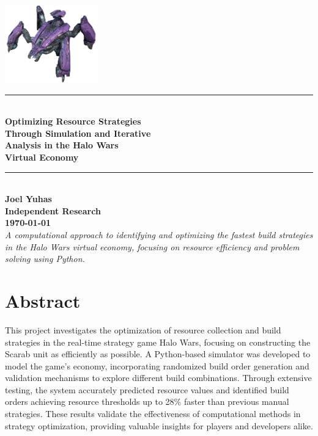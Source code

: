 \documentclass[a4paper, 12pt, english]{article}
\begin{document}
\begin{titlepage}
\begin{center}
\vspace*{2cm} %
\includegraphics[width=0.3\textwidth]{scarab.png} \\[1cm] %
\newcommand{\HRule}[1]{\rule{\linewidth}{#1}} %
\HRule{2pt} \\[0.5cm]
\textbf{\LARGE Optimizing Resource Strategies   \\[0.2cm] 
Through Simulation and Iterative  \\[0.3cm]
Analysis in the Halo Wars \\[0.3cm]
Virtual Economy} \\[0.5cm]
\HRule{2pt} \\[1cm]



\textbf{\large Joel Yuhas} \\[1cm]

\textbf{\large Independent Research} \\[0.5cm]

\textbf{\large \today} \\[2cm]

\textit{A computational approach to identifying and optimizing the fastest build strategies in the Halo Wars virtual economy, focusing on resource efficiency and problem solving using Python.}

\vfill

\end{center}
\end{titlepage}





\newpage
\section{Abstract}
This project investigates the optimization of resource collection and build strategies in the real-time strategy game Halo Wars, focusing on constructing the Scarab unit as efficiently as possible. A Python-based simulator was developed to model the game’s economy, incorporating randomized build order generation and validation mechanisms to explore different build combinations. Through extensive testing, the system accurately predicted resource values and identified build orders achieving resource thresholds up to 28\% faster than previous manual strategies. These results validate the effectiveness of computational methods in strategy optimization, providing valuable insights for players and developers alike.
\end{document}
